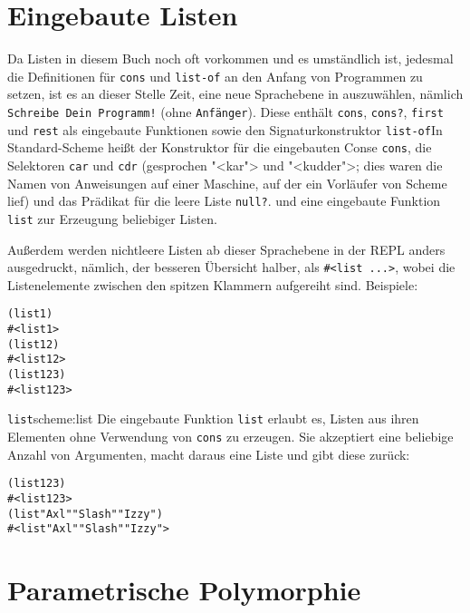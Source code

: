 \section{Eingebaute Listen}

Da Listen in diesem Buch noch oft vorkommen und es umständlich
ist, jedesmal die Definitionen für \texttt{cons} und \texttt{list-of} an den Anfang
von Programmen zu setzen, ist es an dieser Stelle Zeit, eine neue
Sprachebene in \drscheme{} auszuwählen, nämlich \texttt{Schreibe Dein Programm!}
(ohne \texttt{Anfänger}).  Diese enthält \texttt{cons},
\texttt{cons?}, \texttt{first} und \texttt{rest} als eingebaute
Funktionen sowie den Signaturkonstruktor \texttt{list-of}{In Standard-Scheme heißt der Konstruktor für
  die eingebauten Conse \texttt{cons}, die
  Selektoren \texttt{car} und \texttt{cdr}
  (gesprochen "<kar"> und "<kudder">; dies waren die Namen von Anweisungen auf einer
  Maschine, auf der ein Vorläufer von Scheme lief) und das Prädikat
  für die leere Liste \texttt{null?}.} und eine
eingebaute Funktion \texttt{list} zur Erzeugung beliebiger Listen.

Außerdem werden nichtleere Listen ab dieser Sprachebene in der REPL
anders ausgedruckt, nämlich, der besseren Übersicht halber, als
\verb|#<list ...>|,
wobei die Listenelemente zwischen den spitzen Klammern aufgereiht sind.
Beispiele:

\begin{alltt}
(list 1)
\evalsto{} #<list 1>
(list 1 2)
\evalsto{} #<list 1 2>
(list 1 2 3)
\evalsto{} #<list 1 2 3>
\end{alltt}
%
\begin{feature}{\texttt{list}}{scheme:list}
  Die eingebaute Funktion \texttt{list} erlaubt es, Listen aus ihren Elementen
  ohne Verwendung von \texttt{cons} zu erzeugen.  Sie
  akzeptiert eine beliebige Anzahl von Argumenten, macht daraus eine
  Liste und gibt diese zurück:
%
\begin{alltt}
(list 1 2 3)
\evalsto{} #<list 1 2 3>
(list "Axl" "Slash" "Izzy")
\evalsto{} #<list "Axl" "Slash" "Izzy">
\end{alltt}
\end{feature}


\section{Parametrische Polymorphie}
\label{sec:parametric-polymorphism}
\label{sec:more-lists}

